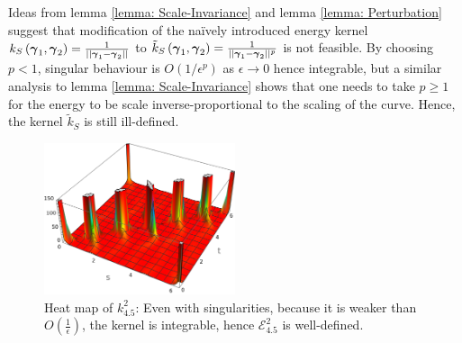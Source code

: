 \documentclass[../dissertation.tex]{subfiles}
\begin{document}
\begin{remark}
    Ideas from lemma \ref{lemma: Scale-Invariance} and lemma \ref{lemma: Perturbation} suggest that modification of the na\"ively introduced energy kernel $k_S \left( \boldsymbol{\gamma}_1, \boldsymbol{\gamma}_2 \right) = \frac{1}{\lvert \lvert \boldsymbol{\gamma}_1 - \boldsymbol{\gamma}_2 \rvert \rvert}$ to $\tilde k_S \left( \boldsymbol{\gamma}_1, \boldsymbol{\gamma}_2 \right) = \frac{1}{\lvert \lvert \boldsymbol{\gamma}_1 - \boldsymbol{\gamma}_2 \rvert \rvert^p}$ is not feasible.
    By choosing $p < 1$, singular behaviour is $O \left( 1/\epsilon^p \right)$ as $\epsilon \rightarrow 0$ hence integrable,
    but a similar analysis to lemma \ref{lemma: Scale-Invariance} shows that
    one needs to take $p \geq 1$ for the energy to be scale inverse-proportional to the scaling of the curve.
    Hence, the kernel $\tilde k_S$ is still ill-defined.
\end{remark}

\begin{figure}[tpb]
    \centering
    \includegraphics[width=0.5\textwidth]{sections/tangentPointEnergyImgs/kHeatMap3}
    \caption{Heat map of $k_{4.5}^{2}$: Even with singularities, because it is weaker than $O \left( \frac{1}{\epsilon} \right)$, the kernel is integrable, hence $\mathcal{E}_{4.5}^{2}$ is well-defined.}
    \label{fig: Low-Order Pole}
\end{figure}
\end{document}
